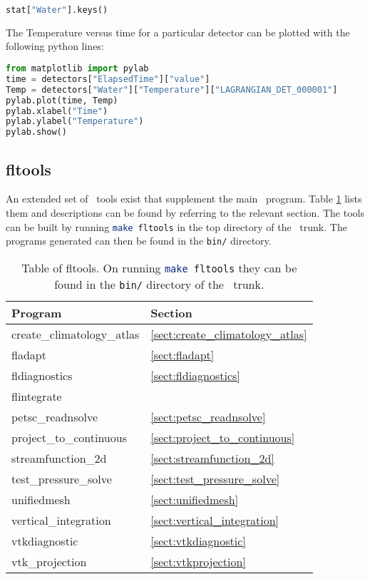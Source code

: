 \begin{lstlisting}[language=Python]
stat["Water"].keys()
\end{lstlisting}

The Temperature versus time for a particular detector can be plotted with the following python lines:

\begin{lstlisting}[language=Python]
from matplotlib import pylab
time = detectors["ElapsedTime"]["value"]
Temp = detectors["Water"]["Temperature"]["LAGRANGIAN_DET_000001"]
pylab.plot(time, Temp)
pylab.xlabel("Time")
pylab.ylabel("Temperature")
pylab.show()
\end{lstlisting}

\subsection{fltools}
\label{sect:fltools}
An extended set of \fluidity\ tools exist that supplement the main
\fluidity\ program. Table \ref{tab:fltools} lists them and descriptions can
be found by referring to the relevant section. The tools can be built by
running \lstinline[language = bash]+make fltools+ in the top directory of
the \fluidity\ trunk. The programs generated can then be found in the
\lstinline[language = bash]+bin/+ directory.

\begin{table}
\begin{center}
  \begin{tabular}{| l | l |}
    \hline
	Program					& Section 				\\
    \hline
	create\_climatology\_atlas		& \ref{sect:create_climatology_atlas}	\\
	fladapt					& \ref{sect:fladapt}			\\
	fldiagnostics				& \ref{sect:fldiagnostics}		\\		
	flintegrate				& \\
	petsc\_readnsolve			& \ref{sect:petsc_readnsolve} 		\\
	project\_to\_continuous			& \ref{sect:project_to_continuous} 	\\
	streamfunction\_2d			& \ref{sect:streamfunction_2d} 		\\	
	test\_pressure\_solve			& \ref{sect:test_pressure_solve}	\\
	unifiedmesh				& \ref{sect:unifiedmesh} 		\\	
    	vertical\_integration			& \ref{sect:vertical_integration} 	\\
	vtkdiagnostic				& \ref{sect:vtkdiagnostic}		\\
	vtk\_projection				& \ref{sect:vtkprojection}		\\
    \hline
  \end{tabular}
\end{center}
\caption[Table of fltools]{Table of fltools. On running \lstinline[language = bash]+make fltools+ they can be found in the \lstinline[language = bash]+bin/+ directory of the \fluidity\ trunk.}
\label{tab:fltools}
\end{table}

